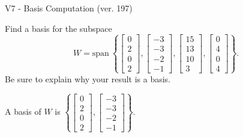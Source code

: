 \begin{exercise}
  \begin{exerciseTitle}V7 - Basis Computation (ver. 197)\end{exerciseTitle}
  \begin{exerciseStatement}
    Find a basis for the subspace 
\[W=\mathrm{span}\ \left\{\left[\begin{array}{r}
0 \\
2 \\
0 \\
2
\end{array}\right] , \left[\begin{array}{r}
-3 \\
-3 \\
-2 \\
-1
\end{array}\right] , \left[\begin{array}{r}
15 \\
13 \\
10 \\
3
\end{array}\right] , \left[\begin{array}{r}
0 \\
4 \\
0 \\
4
\end{array}\right]\right\}.\]
 Be sure to explain why your result is a basis.


  \end{exerciseStatement}
  \begin{exerciseAnswer}
   A basis of \(W\) is  \(\left\{\left[\begin{array}{r}
0 \\
2 \\
0 \\
2
\end{array}\right] , \left[\begin{array}{r}
-3 \\
-3 \\
-2 \\
-1
\end{array}\right]\right\}\).
  


  \end{exerciseAnswer}
\end{exercise}